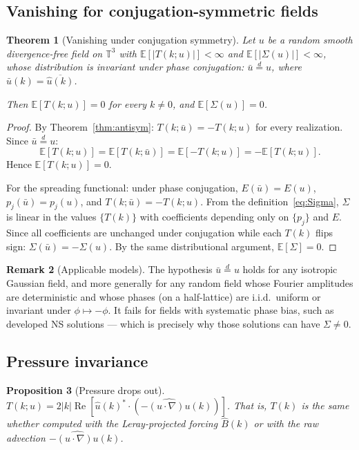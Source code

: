 \documentclass[11pt]{article}
\newtheorem{theorem}{Theorem}[section]
\newtheorem{proposition}[theorem]{Proposition}
\theoremstyle{definition}
\newtheorem{remark}[theorem]{Remark}
\newcommand{\T}{\mathbb{T}}
\newcommand{\E}{\mathbb{E}}
\DeclareMathOperator{\re}{Re}
\begin{document}
\subsection{Vanishing for conjugation-symmetric fields}

\begin{theorem}[Vanishing under conjugation symmetry]
\label{thm:gaussian}
Let $u$ be a random smooth divergence-free field on $\T^3$
with $\E[|T(k;u)|]<\infty$ and $\E[|\Sigma(u)|]<\infty$,
whose distribution is invariant under phase conjugation:
$\bar u \stackrel{d}{=} u$, where
$\hat{\bar u}(k) = \overline{\hat u(k)}$.

Then $\E[T(k;u)]=0$ for every $k\neq 0$, and
$\E[\Sigma(u)]=0$.
\end{theorem}

\begin{proof}
By Theorem~\ref{thm:antisym}: $T(k;\bar u) = -T(k;u)$
for every realization.  Since $\bar u\stackrel{d}{=}u$:
\begin{equation}
\E[T(k;u)] = \E[T(k;\bar u)] = \E[-T(k;u)]
= -\E[T(k;u)].
\end{equation}
Hence $\E[T(k;u)]=0$.

For the spreading functional: under phase conjugation,
$E(\bar u) = E(u)$, $p_j(\bar u)=p_j(u)$, and
$T(k;\bar u) = -T(k;u)$.  From the
definition~\eqref{eq:Sigma}, $\Sigma$ is linear in the
values $\{T(k)\}$ with coefficients depending only on
$\{p_j\}$ and $E$.  Since all coefficients are unchanged
under conjugation while each $T(k)$ flips sign:
$\Sigma(\bar u) = -\Sigma(u)$.  By the same distributional
argument, $\E[\Sigma]=0$.
\end{proof}

\begin{remark}[Applicable models]
The hypothesis $\bar u\stackrel{d}{=}u$ holds for any
isotropic Gaussian field, and more generally for any
random field whose Fourier amplitudes are deterministic
and whose phases (on a half-lattice) are i.i.d.\ uniform
or invariant under $\phi\mapsto -\phi$.  It fails for
fields with systematic phase bias, such as developed
NS solutions --- which is precisely why those solutions
can have $\Sigma\neq 0$.
\end{remark}

\subsection{Pressure invariance}

\begin{proposition}[Pressure drops out]
\label{prop:pressure}
$T(k;u) = 2|k|\re[\hat u(k)^*\cdot
(-\widehat{(u\cdot\nabla)u}(k))]$.
That is, $T(k)$ is the same whether computed with the
Leray-projected forcing $\hat B(k)$ or with the raw
advection $-\widehat{(u\cdot\nabla)u}(k)$.
\end{proposition}
\end{document}
